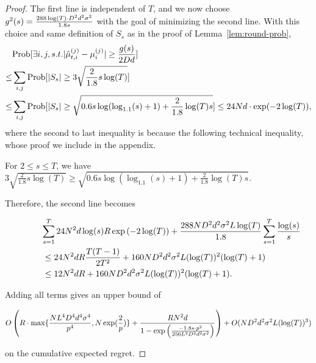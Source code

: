 \begin{proof}
The first line is independent of $T$, and we now choose
$g^2(s) = \frac{288\log(T) \cdot D^2 d^2 \sigma^2}{1.8 s}$
with the goal of minimizing the second line.
With this choice and same definition of $S_{s}$ as in the proof of Lemma~\ref{lem:round-prob}, 
\begin{align*}
&\Prob{\exists i,j, s.t. |\ArmE{t}{i}{j} - \Arm{i}{j}|\geq \frac{g(s)}{2\Diam d}} \\
\leq &\sum_{i,j}\Prob{|S_s|\geq 3\sqrt{\frac{2}{1.8}s\log(T)}} \\
\leq &\sum_{i,j}\Prob{|S_s|\geq \sqrt{0.6s\log(\log_{1.1}(s)+1)+\frac{2}{1.8}\log(T)s}} \leq 24\ARMNUM d \cdot \exp(-2\log(T)),
\end{align*}
where the second to last inequality is because the following technical inequality, whose proof we include in the appendix.

\begin{lemma} \label{lem:n1-inequality}
For $2\leq s\leq T$, we have $3\sqrt{\frac{2}{1.8}s\log(T)} \geq \sqrt{0.6s\log(\log_{1.1}(s)+1)+\frac{2}{1.8}\log(T)s}$.
\end{lemma}



Therefore, the second line becomes

\begin{align*}
\lefteqn{\sum_{s=1}^{T} 24\ARMNUM^2 d \log(s) \MAXR \exp\left(-2\log(T)\right)  +
          \frac{288\ARMNUM\Diam^2 d^2\sigma^2
          \TieDensity\log(T)}{1.8}\sum_{s=1}^{T}\frac{\log(s)}{s}}
\\ & \leq
24\ARMNUM^2 d R\frac{T(T-1)}{2T^2}  + 160 \ARMNUM \Diam^2 d^2\sigma^2
          \TieDensity(\log(T))^2(\log(T)+1)
  \\ & \leq
12 \ARMNUM^2 d R  + 160 \ARMNUM\Diam^2 d^2\sigma^2 \TieDensity(\log(T))^2(\log(T)+1). 
\end{align*}

Adding all terms gives an upper bound of 

\begin{multline*}
O \left(R\cdot \max\{\frac{N L^4 D^4 d^4 \sigma^4}{p^4}, N\exp(\frac{2}{p})\}
  + \frac{R N^2 d}{1 - \exp \left(
    \frac{-1.8 s \cdot p^2}{256 L^2 D^2 d^2 \sigma^2}
  \right)} \right) +
O(ND^2 d^2\sigma^2 L(\log(T))^3) 
\end{multline*}

on the cumulative expected regret.
\end{proof}

